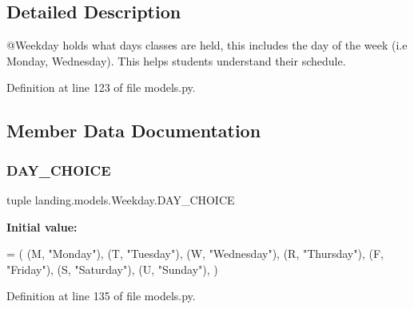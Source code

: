 \subsection{Detailed Description}
\begin{DoxyVerb}@Weekday holds what days classes are held, this includes the
        day of the week (i.e Monday, Wednesday). This helps students understand their schedule.
\end{DoxyVerb}
 

Definition at line 123 of file models.\+py.



\subsection{Member Data Documentation}
\mbox{\label{classlanding_1_1models_1_1Weekday_a7087116a99b548d0bfb99890d31b377a}} 
\subsubsection{\texorpdfstring{D\+A\+Y\+\_\+\+C\+H\+O\+I\+CE}{DAY\_CHOICE}}
{\footnotesize\ttfamily tuple landing.\+models.\+Weekday.\+D\+A\+Y\+\_\+\+C\+H\+O\+I\+CE\hspace{0.3cm}{\ttfamily [static]}}

{\bfseries Initial value\+:}
\begin{DoxyCode}
=  (
        (M, \textcolor{stringliteral}{"Monday"}),
        (T, \textcolor{stringliteral}{"Tuesday"}),
        (W, \textcolor{stringliteral}{"Wednesday"}),
        (R, \textcolor{stringliteral}{"Thursday"}),
        (F, \textcolor{stringliteral}{"Friday"}),
        (S, \textcolor{stringliteral}{"Saturday"}),
        (U, \textcolor{stringliteral}{"Sunday"}),
    )
\end{DoxyCode}


Definition at line 135 of file models.\+py.

\mbox{\label{classlanding_1_1models_1_1Weekday_a7d9b7483659a0aa50e092bf758996cf1}} 
